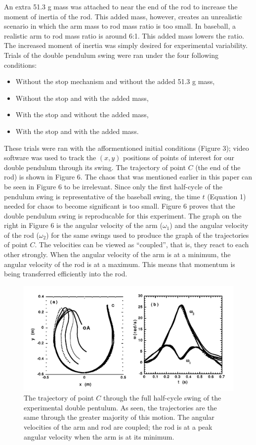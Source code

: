 \documentclass[%
 aip,
 amsmath,amssymb,
 reprint,%
 floatfix,%
]{revtex4-1}
\begin{document}
An extra 51.3 g mass was attached to near the end of the rod to increase the moment of inertia of the rod. This added mass, however, creates an unrealistic scenario in which the arm mass to rod mass ratio is too small. In baseball, a realistic arm to rod mass ratio is around 6:1. This added mass lowers the ratio. The increased moment of inertia was simply desired for experimental variability. Trials of the double pendulum swing were ran under the four following conditions:

\begin{itemize}
	\item Without the stop mechanism and without the added 51.3 g mass,
	\item Without the stop and with the added mass,
	\item With the stop and without the added mass,
	\item With the stop and with the added mass.
\end{itemize}



These trials were ran with the afformentioned initial conditions (Figure 3); video software was used to track the $(x,y)$ positions of points of interest for our double pendulum through its swing. The trajectory of point $C$ (the end of the rod) is shown in Figure 6. The chaos that was mentioned earlier in this paper can be seen in Figure 6 to be irrelevant. Since only the first half-cycle of the pendulum swing is representative of the baseball swing, the time $t$ (Equation 1) needed for chaos to become significant is too small. Figure 6 proves that the double pendulum swing is reproducable for this experiment. The graph on the right in Figure 6 is the angular velocity of the arm ($\omega_1$) and the angular velocity of the rod ($\omega_2$) for the same swings used to produce the graph of the trajectories of point $C$. The velocities can be viewed as “coupled”, that is, they react to each other strongly. When the angular velocity of the arm is at a minimum, the angular velocity of the rod is at a maximum. This means that momentum is being transferred efficiently into the rod. 

\begin{figure}[H]
	\centering
	\includegraphics[scale=0.4]{trajectory.png}
	\caption{The trajectory of point $C$ through the full half-cycle swing of the experimental double pentulum. As seen, the trajectories are the same through the greater majority of this motion. The angular velocities of the arm and rod are coupled; the rod is at a peak angular velocity when the arm is at its minimum.}
\end{figure}
\end{document}
